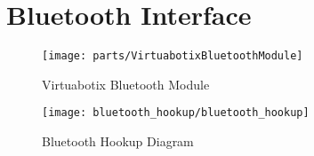 \chapter{Bluetooth Interface}
\begin{figure}[h]
  \texttt{[image: parts/VirtuabotixBluetoothModule]}
  \centering
  \caption{Virtuabotix Bluetooth Module}
  \label{fig:bluetooth_module}
\end{figure}

\begin{figure}[h]
  \texttt{[image: bluetooth\_hookup/bluetooth\_hookup]}
  \centering
  \caption{Bluetooth Hookup Diagram}
  \label{fig:bluetooth_hookup_diagram}
\end{figure}
